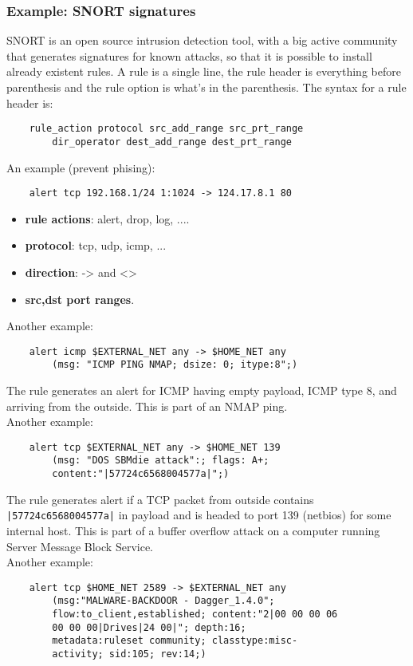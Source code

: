 \documentclass[a4paper, 10pt, titlepage]{article}
\begin{document}
\subsubsection*{Example: SNORT signatures}
SNORT is an open source intrusion detection tool, with a big active community that generates signatures for known attacks, so that it is possible to install already existent rules. A rule is a single line, the rule header is everything before parenthesis and the rule option is what’s in the parenthesis. The syntax for a rule header is:
\begin{lstlisting}
	rule_action protocol src_add_range src_prt_range
		dir_operator dest_add_range dest_prt_range
\end{lstlisting}
An example (prevent phising):
\begin{lstlisting}
	alert tcp 192.168.1/24 1:1024 -> 124.17.8.1 80
\end{lstlisting}
\begin{itemize}
	\item \textbf{rule actions}: alert, drop, log, ....
	\item \textbf{protocol}: tcp, udp, icmp, ...
	\item \textbf{direction}: -> and <>
	\item \textbf{src,dst port ranges}.
\end{itemize}
Another example:
\begin{lstlisting}
	alert icmp $EXTERNAL_NET any -> $HOME_NET any
		(msg: "ICMP PING NMAP; dsize: 0; itype:8";)
\end{lstlisting}
The rule generates an alert for ICMP having empty payload, ICMP type 8, and arriving from the outside. This is part of an NMAP ping.\medskip\\
Another example:
\begin{lstlisting}
	alert tcp $EXTERNAL_NET any -> $HOME_NET 139
		(msg: "DOS SBMdie attack":; flags: A+;
		content:"|57724c6568004577a|";)
\end{lstlisting}
The rule generates alert if a TCP packet from outside contains \lstinline{|57724c6568004577a|} in payload and is headed to port 139 (netbios) for some internal host. This is part of a buffer overflow attack on a computer running Server Message Block Service.\medskip\\
Another example:
\begin{lstlisting}
	alert tcp $HOME_NET 2589 -> $EXTERNAL_NET any
		(msg:"MALWARE-BACKDOOR - Dagger_1.4.0";
		flow:to_client,established; content:"2|00 00 00 06
		00 00 00|Drives|24 00|"; depth:16;
		metadata:ruleset community; classtype:misc-
		activity; sid:105; rev:14;)
\end{lstlisting}
\end{document}
